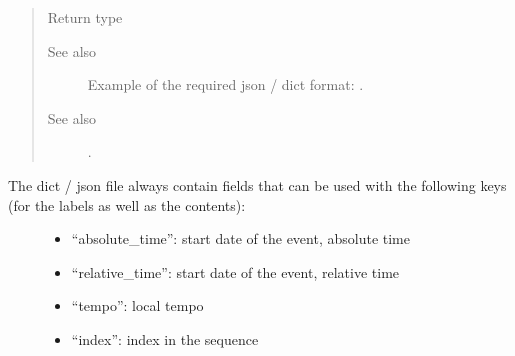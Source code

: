 \documentclass[letterpaper,10pt,english]{sphinxmanual}
\begin{document}
\begin{fulllineitems}
\begin{quote}
\begin{description}
\item[{Return type}] \leavevmode
{\hyperref[\detokenize{index:Generator.Generator}]{}}

\item[{See also}] \leavevmode
Example of the required json / dict format: .

\item[{See also}] \leavevmode
{} .

\end{description}\end{quote}
\begin{description}
\item[{The dict / json file always contain fields that can be used with the following keys (for the labels as well as the contents):}] \leavevmode\begin{itemize}
\item {} 
“absolute\_time”: start date of the event, absolute time

\item {} 
“relative\_time”: start date of the event, relative time

\item {} 
“tempo”: local tempo

\item {} 
“index”: index in the sequence

\end{itemize}

\end{description}

\end{fulllineitems}

\end{document}
